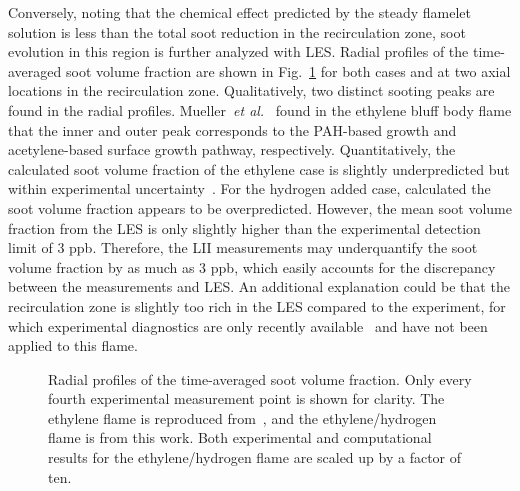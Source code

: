 \documentclass[review,3p,times]{elsarticle}
\begin{document}
Conversely, noting that the chemical effect predicted by the steady flamelet solution is less than the total soot reduction in the recirculation zone, soot evolution in this region is further analyzed with LES.  Radial profiles of the time-averaged soot volume fraction are shown in Fig.~\ref{fig:fv_radial} for both cases and at two axial locations in the recirculation zone.  Qualitatively, two distinct sooting peaks are found in the radial profiles.  Mueller~\emph{et al.}~\cite{mueller13} found in the ethylene bluff body flame that the inner and outer peak corresponds to the PAH-based growth and acetylene-based surface growth pathway, respectively.  Quantitatively, the \textcolor{Rv1}{calculated} soot volume fraction of the ethylene case is slightly underpredicted but within experimental uncertainty~\cite{mueller13}.  For the hydrogen added case, \textcolor{Rv1}{calculated }the soot volume fraction appears to be overpredicted.  However, the mean soot volume fraction from the LES is only slightly higher than the experimental detection limit of 3 ppb.  Therefore, the LII measurements may \textcolor{Rv1}{underquantify} the soot volume fraction by as much as 3 ppb, which easily accounts for the discrepancy between the measurements and LES.  \textcolor{Rv1}{An additional explanation could be that the recirculation zone is slightly too rich in the LES compared to the experiment, for which experimental diagnostics are only recently available~\cite{buxton13} and have not been applied to this flame.}


\begin{figure}[t]
  \centering
  \scriptsize
  \resizebox{0.49\textwidth}{!}{}
  \resizebox{0.49\textwidth}{!}{}
  \vspace{-0.3in}
  \normalsize
  \caption{Radial profiles of the time-averaged soot volume fraction.  Only every fourth experimental measurement point is shown for clarity.  The ethylene flame is reproduced from~\cite{mueller13}, and the ethylene/hydrogen flame is from this work.  Both experimental and computational results for the ethylene/hydrogen flame are scaled up by a factor of ten.}
  \label{fig:fv_radial}
\end{figure}
\end{document}

